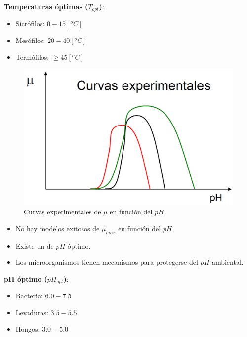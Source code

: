             \textbf{Temperaturas óptimas (\(T_{opt}\))}:
            \begin{multicols}{3}
                \begin{itemize}
                    \item Sicrófilos: \(0-15 [{}^{o} C]\)
                    \item Mesófilos: \(20-40 [{}^{o} C]\)
                    \item Termófilos: \(\geq 45 [{}^{o} C]\)
                \end{itemize}
            \end{multicols}
            
            
            \begin{multicols}{2}
                \begin{figure}
                    \centering
                    \includegraphics[width=.87\textwidth]{img/graficos/ph_mu_max.png}
                    \caption{Curvas experimentales de \(\mu\) en función del \(pH\)}
                    \label{fig:ph_mu_max}
                \end{figure}
                
                \begin{itemize}
                    \item No hay modelos exitosos de \(\mu_{max}\) en función del \(pH\).
                    \item Existe un  de \(pH\) óptimo.
                    \item Los microorganismos tienen mecanismos para protegerse del \(pH\) ambiental.
                \end{itemize}
            \end{multicols}
            \textbf{pH óptimo (\(pH_{opt}\))}:
            \begin{multicols}{3}
                \begin{itemize}
                    \item Bacteria: \(6.0-7.5\)
                    \item Levaduras: \(3.5-5.5\)
                    \item Hongos: \(3.0-5.0\)
                \end{itemize}
            \end{multicols}
            
